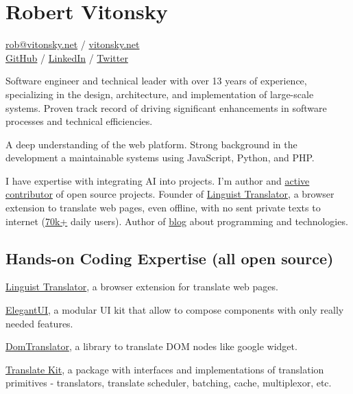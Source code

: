 \documentclass{vitonsky}
\begin{document}
\vitonskyPrintPhoto{}

\section*{\Large{Robert Vitonsky}}

\href{mailto:rob@vitonsky.net}{rob@vitonsky.net} / \href{https://vitonsky.net}{vitonsky.net}\\%
\href{https://github.com/vitonsky}{GitHub} /
\href{https://www.linkedin.com/in/vitonsky}{LinkedIn} /
\href{https://twitter.com/intent/follow?screen_name=rvitonsky}{Twitter}

\vspace*{12pt}

Software engineer and technical leader with over 13 years of experience, specializing in the design, architecture, and implementation of large-scale systems. Proven track record of driving significant enhancements in software processes and technical efficiencies.

A deep understanding of the web platform. Strong background in the development a maintainable systems using JavaScript, Python, and PHP.

I have expertise with integrating AI into projects. I'm author and \href{https://github.com/vitonsky}{active contributor} of open source projects. Founder of \href{https://linguister.io}{Linguist Translator}, a browser extension to translate web pages, even offline, with no sent private texts to internet (\href{https://github.com/translate-tools/linguist}{70k+} daily users). Author of \href{https://vitonsky.net/}{blog} about programming and technologies.

\subsection*{Hands-on Coding Expertise (all open source)}

\href{https://github.com/translate-tools/linguist}{Linguist Translator}, a browser
extension for translate web pages.

\href{https://github.com/vitonsky/react-elegant-ui}{ElegantUI}, a
modular UI kit that allow to compose components with only really needed features.

\href{https://github.com/translate-tools/domtranslator}{DomTranslator}, a library to translate DOM nodes like google widget.

\href{https://github.com/translate-tools/core}{Translate Kit}, a package with interfaces and implementations of translation primitives - translators, translate scheduler, batching, cache, multiplexor, etc.
\end{document}
